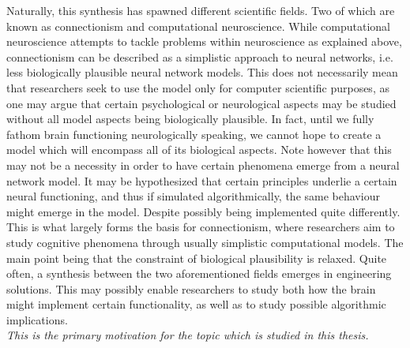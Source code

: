 Naturally, this synthesis has spawned different scientific fields. Two of which are known as connectionism and computational neuroscience. While computational neuroscience attempts to tackle problems within neuroscience as explained above, connectionism can be described as a simplistic approach to neural networks, i.e. less biologically plausible neural network models. This does not necessarily mean that researchers seek to use the model only for computer scientific purposes, as one may argue that certain psychological or neurological aspects may be studied without all model aspects being biologically plausible. In fact, until we fully fathom brain functioning neurologically speaking, we cannot hope to create a model which will encompass all of its biological aspects. Note however that this may not be a necessity in order to have certain phenomena emerge from a neural network model. It may be hypothesized that certain principles underlie a certain neural functioning, and thus if simulated algorithmically, the same behaviour might emerge in the model. Despite possibly being implemented quite differently. This is what largely forms the basis for connectionism, where researchers aim to study cognitive phenomena through usually simplistic computational models. The main point being that the constraint of biological plausibility is relaxed.
Quite often, a synthesis between the two aforementioned fields emerges in engineering solutions. This may possibly enable researchers to study both how the brain might implement certain functionality, as well as to study possible algorithmic implications.
\\

\textit{This is the primary motivation for the topic which is studied in this thesis.}
\\

